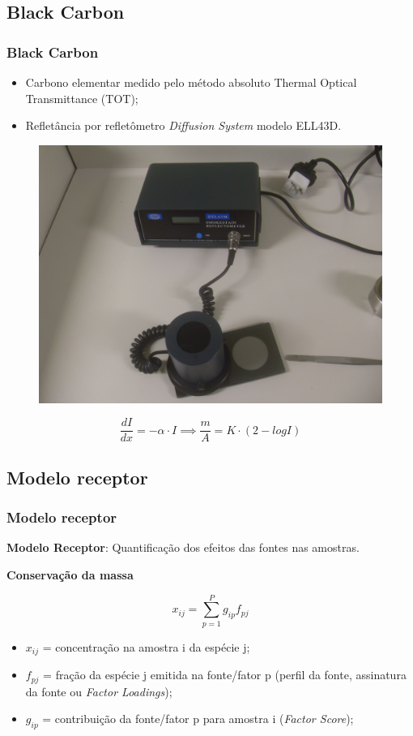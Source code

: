 \subsection{Black Carbon}
\begin{frame}
  \frametitle{Black Carbon}

\begin{itemize}
	\item Carbono elementar medido pelo método absoluto Thermal Optical Transmittance (TOT);
	\item Refletância por refletômetro \textit{Diffusion System} modelo ELL43D.
\end{itemize}
 
  \begin{figure}[H]
  	\centering
  	\includegraphics[width=0.38\linewidth]{../../inputs/images/refletometro.jpg}
  \end{figure}

  \begin{equation*}
  \frac{dI}{dx} = -\alpha \cdot I
  \implies 	 \frac{m}{A} = K \cdot (2-logI)
  \end{equation*}
\end{frame}

\subsection{Modelo receptor}
\begin{frame}
  \frametitle{Modelo receptor}
  \textbf{Modelo Receptor}: Quantificação dos efeitos das fontes nas amostras.
  
   \begin{center}
   	\textbf{Conservação da massa}
   \end{center}
     \begin{equation*}
     x_{ij} = \sum_{p=1}^{P} g_{ip}f_{pj} %
     \end{equation*} 
     \begin{footnotesize}
    
     \begin{itemize}
     	\item $x_{ij}$ = concentração na amostra i da espécie j;
     	\item $f_{pj}$ = fração da espécie j emitida na fonte/fator p 
     	(perfil da fonte, assinatura da fonte ou \textit{Factor Loadings}); 
     	\item $g_{ip}$ = contribuição da fonte/fator p para amostra i (\textit{Factor Score});
     \end{itemize}
         \end{footnotesize}
\end{frame}

